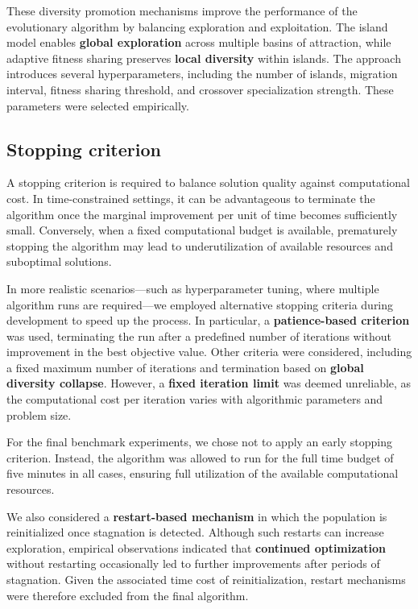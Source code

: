 \documentclass[a4paper,10pt]{article} %
\begin{document}
\noindent
These diversity promotion mechanisms improve the performance of the evolutionary algorithm by balancing exploration and exploitation. The island model enables \textbf{global exploration} across multiple basins of attraction, while adaptive fitness sharing preserves \textbf{local diversity} within islands. The approach introduces several hyperparameters, including the number of islands, migration interval, fitness sharing threshold, and crossover specialization strength. These parameters were selected empirically.

\subsection{Stopping criterion}\label{sec_stop}
A stopping criterion is required to balance solution quality against computational cost. In time-constrained settings, it can be advantageous to terminate the algorithm once the marginal improvement per unit of time becomes sufficiently small. Conversely, when a fixed computational budget is available, prematurely stopping the algorithm may lead to underutilization of available resources and suboptimal solutions.

\noindent
In more realistic scenarios—such as hyperparameter tuning, where multiple algorithm runs are required—we employed alternative stopping criteria during development to speed up the process. In particular, a \textbf{patience-based criterion} was used, terminating the run after a predefined number of iterations without improvement in the best objective value. Other criteria were considered, including a fixed maximum number of iterations and termination based on \textbf{global diversity collapse}. However, a \textbf{fixed iteration limit} was deemed unreliable, as the computational cost per iteration varies with algorithmic parameters and problem size.

\noindent
For the final benchmark experiments, we chose not to apply an early stopping criterion. Instead, the algorithm was allowed to run for the full time budget of five minutes in all cases, ensuring full utilization of the available computational resources.

\noindent
We also considered a \textbf{restart-based mechanism} in which the population is reinitialized once stagnation is detected. Although such restarts can increase exploration, empirical observations indicated that \textbf{continued optimization} without restarting occasionally led to further improvements after periods of stagnation. Given the associated time cost of reinitialization, restart mechanisms were therefore excluded from the final algorithm.
\end{document}
